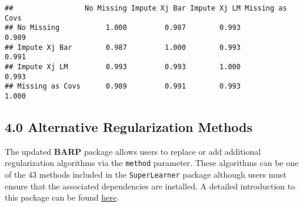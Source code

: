 \documentclass[]{article}
\newenvironment{Shaded}{\begin{snugshade}}{\end{snugshade}}
\newcommand{\KeywordTok}[1]{\textcolor[rgb]{0.13,0.29,0.53}{\textbf{#1}}}
\newcommand{\DecValTok}[1]{\textcolor[rgb]{0.00,0.00,0.81}{#1}}
\newcommand{\StringTok}[1]{\textcolor[rgb]{0.31,0.60,0.02}{#1}}
\newcommand{\OperatorTok}[1]{\textcolor[rgb]{0.81,0.36,0.00}{\textbf{#1}}}
\newcommand{\NormalTok}[1]{#1}
\begin{document}
\begin{Shaded}
\end{Shaded}

\begin{verbatim}
##                 No Missing Impute Xj Bar Impute Xj LM Missing as Covs
## No Missing           1.000         0.987        0.993           0.989
## Impute Xj Bar        0.987         1.000        0.993           0.991
## Impute Xj LM         0.993         0.993        1.000           0.993
## Missing as Covs      0.989         0.991        0.993           1.000
\end{verbatim}

\subsection{4.0 Alternative Regularization
Methods}\label{alternative-regularization-methods}

The updated \textbf{BARP} package allows users to replace or add
additional regularization algorithms via the \texttt{method} parameter.
These algorithms can be one of the 43 methods included in the
\texttt{SuperLearner} package although users must ensure that the
associated dependencies are installed. A detailed introduction to this
package can be found
\href{https://cran.r-project.org/web/packages/SuperLearner/vignettes/Guide-to-SuperLearner.html}{here}.
\end{document}
